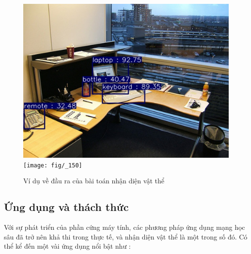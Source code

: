 \documentclass[a4paper]{article}
\begin{document}
\begin{figure}[h]
	\center
	\begin{multicols}{2}
		\includegraphics[width=0.8\linewidth]{fig/z5092846641905_ae48f72dcccc989ba3da7d5c9e133bdc}
		\texttt{[image: fig/\_150]}
	\end{multicols}
	\captionsetup{justification=centering}
	\caption{Ví dụ về đầu ra của bài toán nhận diện vật thể}
	\label{fig:example2}
\end{figure} 

\subsection{\textbf{Ứng dụng và thách thức}}

Với sự phát triển của phần cứng máy tính, các phương pháp ứng dụng mạng học sâu đã trở nên khả thi trong thực tế, và nhận diện vật thể là một trong số đó. Có thể kể đến một vài ứng dụng nổi bật như : 
\end{document}
